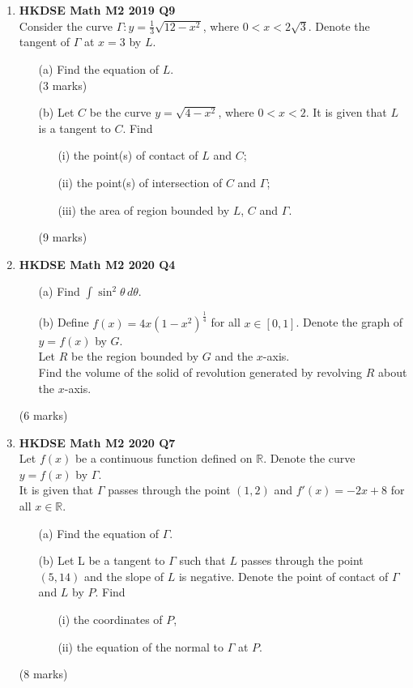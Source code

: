 \documentclass{report}
\begin{document}
\begin{enumerate}
	\newpage

	\item \textbf{HKDSE Math M2 2019 Q9}\\
	Consider the curve $\Gamma : y = \displaystyle\frac{1}{3}\sqrt{12-x^2}$, where $0<x<2\sqrt{3}$. Denote the tangent of $\Gamma$ at $x = 3$ by $L$.  
	\begin{enumerate}
		\item [(a)]Find the equation of $L$. \\(3 marks)
		\item [(b)]Let $C$ be the curve $y = \sqrt{4-x^2}$, where $0<x<2$. It is given that $L$ is a tangent to $C$. Find 
		\begin{enumerate}
			\item [(i)]the point(s) of contact of $L$ and $C$;  
			\item [(ii)]the point(s) of intersection of $C$ and $\Gamma$;  
			\item [(iii)]the area of region bounded by $L$, $C$ and $\Gamma$.
		\end{enumerate}
		(9 marks)
	\end{enumerate}

	\item \textbf{HKDSE Math M2 2020 Q4}
	\begin{enumerate}
		\item [(a)]Find $\displaystyle \int \sin^2{\theta} \,d\theta$. 
		\item [(b)]Define $\displaystyle f(x) = 4x(1-x^2)^{\frac{1}{4}}$ for all $x \in [0,1]$. Denote the graph of $y = f(x) $ by $G$. \\
		Let $R$ be the region bounded by $G$ and the $x$-axis. \\
		Find the volume of the solid of revolution generated by revolving $R$ about the $x$-axis.
	\end{enumerate}
	(6 marks)

	\item \textbf{HKDSE Math M2 2020 Q7}\\
	Let $f(x)$ be a continuous function defined on $\mathbb{R}$. Denote the curve $y = f(x)$ by $\Gamma$. \\
	It is given that $\Gamma $ passes through the point $(1,2)$ and $f'(x) = -2x+8$ for all $x \in \mathbb{R}$. 
	\begin{enumerate}
		\item [(a)]Find the equation of $\Gamma$. 
		\item [(b)]Let L be a tangent to $\Gamma$ such that $L$ passes through the point $(5,14)$ and the slope of $L$ is negative. Denote the point of contact of $\Gamma$ and $L$ by $P$. Find 
		\begin{enumerate}
			\item [(i)]the coordinates of $P$, 
			\item [(ii)]the equation of the normal to $\Gamma $ at $P$.
		\end{enumerate}
	\end{enumerate}
	(8 marks)


\end{enumerate}
\end{document}
